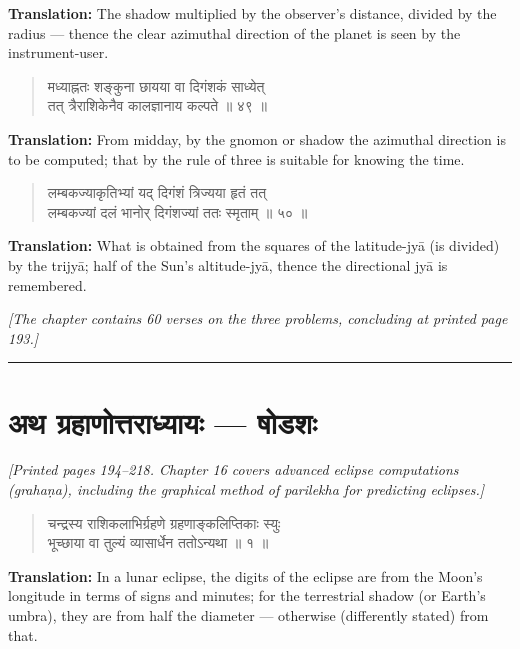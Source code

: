 \documentclass[11pt,a4paper]{article}
\newcommand{\longline}{\noindent\rule{\textwidth}{0.4pt}}
\newcommand{\cnote}[1]{\textcolor{notecolor}{\textit{#1}}}
\newcommand{\dev}[1]{{\devanagarifont #1}}
\newcommand{\dsec}[1]{\section*{\dev{#1}}}
\newenvironment{shloka}{\begin{verse}\devanagarifont\large}{\end{verse}}
\begin{document}
\textbf{Translation:}\quad
The shadow multiplied by the observer's distance, divided by the
radius — thence the clear azimuthal direction of the planet is
seen by the instrument-user.

\vspace{0.3cm}

\begin{shloka}
मध्याह्नतः शङ्कुना छायया वा दिगंशकं साध्येत् \\
तत् त्रैराशिकेनैव कालज्ञानाय कल्पते ॥ ४९ ॥
\end{shloka}

\textbf{Translation:}\quad
From midday, by the gnomon or shadow the azimuthal direction is to
be computed; that by the rule of three is suitable for knowing the
time.

\vspace{0.3cm}

\begin{shloka}
लम्बकज्याकृतिभ्यां यद् दिगंशं त्रिज्यया हृतं तत् \\
लम्बकज्यां दलं भानोर् दिगंशज्यां ततः स्मृताम् ॥ ५० ॥
\end{shloka}

\textbf{Translation:}\quad
What is obtained from the squares of the latitude-jyā (is divided)
by the trijyā; half of the Sun's altitude-jyā, thence the
directional jyā is remembered.

\vspace{0.3cm}

\cnote{[The chapter contains 60 verses on the three problems,
concluding at printed page 193.]}

\longline
\newpage

\dsec{अथ ग्रहाणोत्तराध्यायः — षोडशः}

\cnote{[Printed pages 194–218. Chapter 16 covers advanced eclipse
computations (\textit{grahaṇa}), including the graphical method of
\textit{parilekha} for predicting eclipses.]}

\begin{shloka}
चन्द्रस्य राशिकलाभिर्ग्रहणे ग्रहणाङ्कलिप्तिकाः स्युः \\
भूच्छाया वा तुल्यं व्यासार्धेन ततोऽन्यथा ॥ १ ॥
\end{shloka}

\textbf{Translation:}\quad
In a lunar eclipse, the digits of the eclipse are from the Moon's
longitude in terms of signs and minutes; for the terrestrial shadow
(or Earth's umbra), they are from half the diameter — otherwise
(differently stated) from that.
\end{document}
